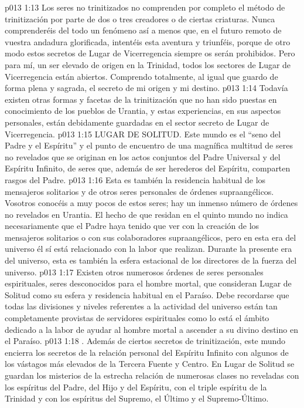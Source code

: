 \vs p013 1:13 Los seres no trinitizados no comprenden por completo el método de trinitización por parte de dos o tres creadores o de ciertas criaturas. Nunca comprenderéis del todo un fenómeno así a menos que, en el futuro remoto de vuestra andadura glorificada, intentéis esta aventura y triunféis, porque de otro modo estos secretos de Lugar de Vicerregencia siempre os serán prohibidos. Pero para mí, un ser elevado de origen en la Trinidad, todos los sectores de Lugar de Vicerregencia están abiertos. Comprendo totalmente, al igual que guardo de forma plena y sagrada, el secreto de mi origen y mi destino.
\vs p013 1:14 Todavía existen otras formas y facetas de la trinitización que no han sido puestas en conocimiento de los pueblos de Urantia, y estas experiencias, en sus aspectos personales, están debidamente guardadas en el sector secreto de Lugar de Vicerregencia.
\vs p013 1:15 LUGAR DE SOLITUD. Este mundo es el “seno del Padre y el Espíritu” y el punto de encuentro de una magnífica multitud de seres no revelados que se originan en los actos conjuntos del Padre Universal y del Espíritu Infinito, de seres que, además de ser herederos del Espíritu, comparten rasgos del Padre.
\vs p013 1:16 Esta es también la residencia habitual de los mensajeros solitarios y de otros seres personales de órdenes supraangélicos. Vosotros conocéis a muy pocos de estos seres; hay un inmenso número de órdenes no revelados en Urantia. El hecho de que residan en el quinto mundo no indica necesariamente que el Padre haya tenido que ver con la creación de los mensajeros solitarios o con sus colaboradores supraangélicos, pero en esta era del universo él sí está relacionado con la labor que realizan. Durante la presente era del universo, esta es también la esfera estacional de los directores de la fuerza del universo.
\vs p013 1:17 Existen otros numerosos órdenes de seres personales espirituales, seres desconocidos para el hombre mortal, que consideran Lugar de Solitud como su esfera y residencia habitual en el Paraíso. Debe recordarse que todas las divisiones y niveles referentes a la actividad del universo están tan completamente provistas de servidores espirituales como lo está el ámbito dedicado a la labor de ayudar al hombre mortal a ascender a su divino destino en el Paraíso.
\vs p013 1:18 \pc {}. Además de ciertos secretos de trinitización, este mundo encierra los secretos de la relación personal del Espíritu Infinito con algunos de los vástagos más elevados de la Tercera Fuente y Centro. En Lugar de Solitud se guardan los misterios de la estrecha relación de numerosas clases no reveladas con los espíritus del Padre, del Hijo y del Espíritu, con el triple espíritu de la Trinidad y con los espíritus del Supremo, el Último y el Supremo\hyp{}Último.
